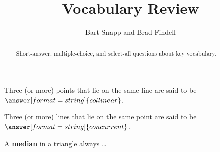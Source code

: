 \documentclass[nooutcomes]{ximera}
\title{Vocabulary Review}
\author{Bart Snapp and Brad Findell}
\begin{document}
\begin{abstract}
Short-answer, multiple-choice, and select-all questions about key vocabulary. 
\end{abstract}
\maketitle

%

\begin{question}  
Three (or more) points that lie on the same line are said to be $\answer[format=string]{collinear}$.  
\end{question}

\begin{question}  
Three (or more) lines that lie on the same point are said to be $\answer[format=string]{concurrent}$.  
\end{question}

%



\begin{question}  
A \textbf{median} in a triangle always \dots
\begin{selectAll}  
\end{selectAll}  
\end{question}
\end{document}
